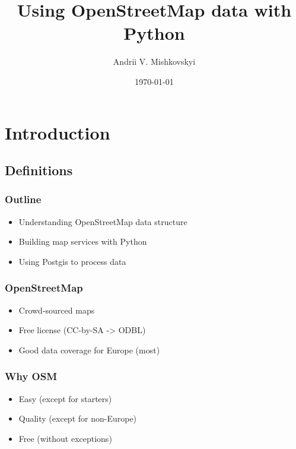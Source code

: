 \documentclass{beamer}
\title{Using OpenStreetMap data with Python}
\author{Andrii V. Mishkovskyi}
\date{\today}
\begin{document}
%     

\begin{frame}
  \titlepage
\end{frame}

\begin{frame}
  \tableofcontents
\end{frame}

\section{Introduction}

\subsection{Definitions}
\label{sec:definitions}

\begin{frame}
  \frametitle{Outline}
  \begin{itemize}
  \item Understanding OpenStreetMap data structure
  \item Building map services with Python
  \item Using Postgis to process data
  \end{itemize}
\end{frame}

\begin{frame}
  \frametitle{OpenStreetMap}
  \begin{itemize}
  \item Crowd-sourced maps
  \item Free license (CC-by-SA -> ODBL)
  \item Good data coverage for Europe (most)
  \end{itemize}
\end{frame}

\begin{frame}
  \frametitle{Why OSM}
  \begin{itemize}
  \item Easy (except for starters)
  \item Quality (except for non-Europe)
  \item Free (without exceptions)
  \end{itemize}
\end{frame}
\end{document}
